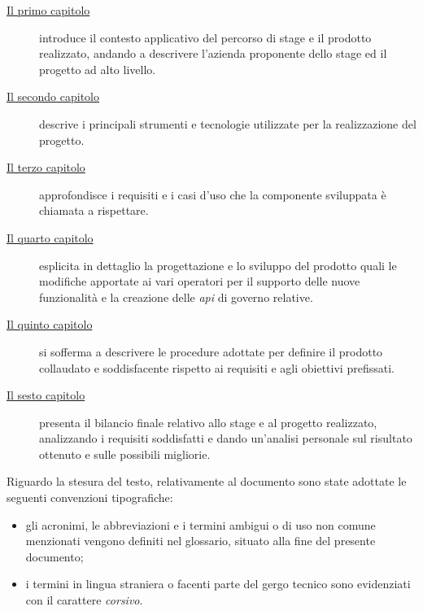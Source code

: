 \begin{description}
	\item[{\hyperref[cap:introduzione]{Il primo capitolo}}] introduce il contesto applicativo del percorso di stage e il prodotto realizzato, andando a descrivere l'azienda proponente dello stage ed il progetto ad alto livello.
 
    \item[{\hyperref[cap:strumenti-tecnologie]{Il secondo capitolo}}] descrive i principali strumenti e tecnologie utilizzate per la realizzazione del progetto.
    
    \item[{\hyperref[cap:analisi-requisiti]{Il terzo capitolo}}] approfondisce i requisiti e i casi d'uso che la componente sviluppata è chiamata a rispettare.
    
    \item[{\hyperref[cap:progettazione-codifica]{Il quarto capitolo}}] esplicita in dettaglio la progettazione e lo sviluppo del prodotto quali le modifiche apportate ai vari operatori per il supporto delle nuove funzionalità e la creazione delle \textit{\gls{api}} di governo relative.
    
    \item[{\hyperref[cap:verifica-validazione]{Il quinto capitolo}}] si sofferma a descrivere le procedure adottate per definire il prodotto collaudato e soddisfacente rispetto ai requisiti e agli obiettivi prefissati.
    
    \item[{\hyperref[cap:conclusioni]{Il sesto capitolo}}] presenta il bilancio finale relativo allo stage e al progetto realizzato, analizzando i requisiti soddisfatti e dando un'analisi personale sul risultato ottenuto e sulle possibili migliorie.
\end{description}

Riguardo la stesura del testo, relativamente al documento sono state adottate le seguenti convenzioni tipografiche:
\begin{itemize}
	\item gli acronimi, le abbreviazioni e i termini ambigui o di uso non comune menzionati vengono definiti nel glossario, situato alla fine del presente documento;
	\item i termini in lingua straniera o facenti parte del gergo tecnico sono evidenziati con il carattere \emph{corsivo}.
\end{itemize}